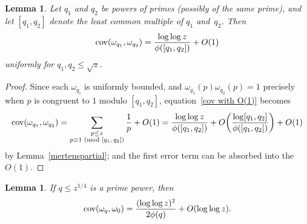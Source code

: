 \documentclass[12pt,reqno]{amsart}
\newtheorem{lemma}[theorem]{Lemma}
\theoremstyle{definition}
\renewcommand{\mod}[1]{{\ifmmode\text{\rm\ (mod~$#1$)}\else\discretionary{}{}{\hbox{ }}\rm(mod~$#1$)\fi}}
\newcommand{\cov}{\mathop{\rm cov}\nolimits}
\begin{document}
\begin{lemma}  \label{little cov lemma}
Let $q_1$ and $q_2$ be powers of primes (possibly of the same prime), and let $[q_1, q_2]$ denote the least common multiple of $q_1$ and~$q_2$. Then
\[
\displaystyle \cov(\omega_{q_1}, \omega_{q_2}) = \frac{\log\log z}{\phi([q_1, q_2])} + O(1)
\]
uniformly for $q_1, q_2 \leq \sqrt z$.
\end{lemma}

\begin{proof}
Since each $\omega_{q_i}$ is uniformly bounded, and $\omega_{q_1}(p)\omega_{q_2}(p)=1$ precisely when $p$ is congruent to $1$ modulo $[q_1,q_2]$, equation~\eqref{cov with O(1)} becomes
\begin{align*}
\cov(\omega_{q_1}, \omega_{q_2}) = \sum_{\substack{p \leq z \\ p\equiv1\mod{[q_1,q_2]}}} \frac1{p} + O(1) 
= \frac{\log\log z}{\phi([q_1,q_2])} + O\bigg( \frac{\log [q_1,q_2]}{\phi([q_1,q_2])} \bigg) + O(1)
\end{align*}
by Lemma~\ref{mertenspartial}; and the first error term can be absorbed into the~$O(1)$.
\end{proof}

\begin{lemma}  \label{medium cov lemma}
If $q \leq z^{1/4}$ is a prime power, then
\[
\displaystyle \cov(\omega_{q}, \omega_{0}) = \frac{(\log\log z)^2}{2 \phi(q)} + O(\log\log z).
\]
\end{lemma}
\end{document}
